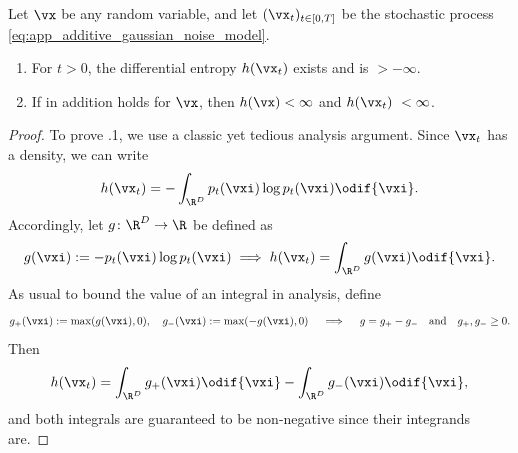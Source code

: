 \documentclass[../../book-main.tex]{subfiles}
\begin{document}
\begin{lemma}\label{lem:diffusion_entropy_exists}
    Let \(\vx\) be any random variable, and let \((\vx_{t})_{t \in [0, T]}\) be the stochastic process \eqref{eq:app_additive_gaussian_noise_model}. 
    \begin{enumerate}
        \item For \(t > 0\), the differential entropy \(h(\vx_{t})\) exists and is \(> -\infty\).
        \item If in addition  holds for \(\vx\), then \(h(\vx) < \infty\) and \(h(\vx_{t})\ < \infty\).
    \end{enumerate}
\end{lemma}
\begin{proof}
    To prove .1, we use a classic yet tedious analysis argument. Since \(\vx_{t}\) has a density, we can write 
    \begin{equation}
        h(\vx_{t}) = -\int_{\R^{D}}p_{t}(\vxi)\log p_{t}(\vxi) \odif{\vxi}.
    \end{equation}
    Accordingly, let \(g \colon \R^{D} \to \R\) be defined as 
    \begin{equation}
        g(\vxi) := -p_{t}(\vxi)\log p_{t}(\vxi) \implies h(\vx_{t}) = \int_{\R^{D}}g(\vxi)\odif{\vxi}.
    \end{equation}
    As usual to bound the value of an integral in analysis, define 
    \begin{equation}
        g_{+}(\vxi) := \max(g(\vxi), 0), \quad g_{-}(\vxi) := \max(-g(\vxi), 0) \quad \implies \quad g = g_{+} - g_{-}\quad \text{and} \quad g_{+}, g_{-} \geq 0.
    \end{equation}
    Then 
    \begin{equation}
        h(\vx_{t}) = \int_{\R^{D}}g_{+}(\vxi)\odif{\vxi} - \int_{\R^{D}}g_{-}(\vxi)\odif{\vxi},
    \end{equation}
    and both integrals are guaranteed to be non-negative since their integrands are. 
    

\end{proof}
\end{document}
